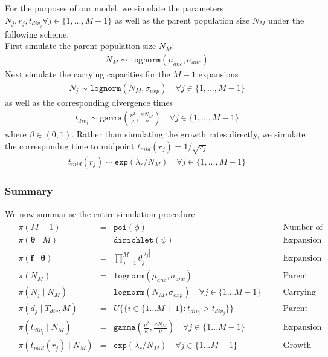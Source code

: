 \documentclass{report}
\theoremstyle{definition}
\begin{document}
For the purposes of our model, we simulate the parameters $N_j, r_j, t_{div_j} \forall j \in \{1,...,M-1\}$ as well as the parent population size $N_{M}$ under the following scheme.\\
First simulate the parent population size $N_{M}$:
\begin{gather}
N_{M} \sim \texttt{lognorm}(\mu_{anc}, \sigma_{anc})
\end{gather}
Next simulate the carrying capacities for the $M-1$ expansions
\begin{gather}
N_{j} \sim \texttt{lognorm}(N_{M}, \sigma_{exp}) \quad\forall j \in \{1,...,M-1\}
\end{gather}
as well as the corresponding divergence times
\begin{gather}
t_{div_j} \sim \texttt{gamma}\left(\frac{\nu^2}{\kappa}, \frac{\kappa N_M}{\nu}\right) \quad\forall j \in \{1,...,M-1\}
\end{gather}
where $\beta \in (0,1)$.
Rather than simulating the growth rates directly, we simulate the correspondng time to midpoint $t_{mid}(r_j) = 1/\sqrt{r_j}$
\begin{gather}
t_{mid}(r_j) \sim \texttt{exp}(\lambda_r/N_M) \quad\forall j \in \{1,...,M-1\}
\end{gather} 
\subsubsection{Summary}
We now summarise the entire simulation procedure
\begin{gather}
\begin{aligned}
&\pi(M-1) &=& \texttt{poi}(\phi) &\quad&\text{Number of expansions} \\
&\pi(\pmb\theta\mid M) &=& \texttt{dirichlet}(\psi) &\quad&\text{Expansion Membership Probabilities} \\
&\pi(\mathbf{f\mid\pmb\theta}) &=& \prod\limits_{j=1}^M\theta_j^{|f_j|}&\quad&\text{Expansion Membership Assignment} \\
&\pi(N_M) &=& \texttt{lognorm}(\mu_{anc},\sigma_{anc}) &\quad&\text{Parent Population Size}\\
&\pi(N_j\mid N_{M}) &=& \texttt{lognorm}(N_{M},\sigma_{exp})\quad\forall j \in \{1...M-1\} &\quad&\text{Carrying Capacities}\\
&\pi(d_j\mid T_{div}, M) &=& U\{\{i\in \{1 ... M+1\} : t_{div_i} > t_{div_j}\}\} &\quad&\text{Parent Populations}\\
&\pi(t_{div_j}\mid N_{M}) &=& \texttt{gamma}\left(\frac{\nu^2}{\kappa}, \frac{\kappa N_M}{\nu}\right) \quad\forall j \in \{1...M-1\} &\quad&\text{Expansion Times}\\
&\pi(t_{mid}(r_j)\mid N_M) &=& \texttt{exp}(\lambda_{r}/N_M)\quad\forall j \in \{1...M-1\} &\quad&\text{Growth Rates}
\end{aligned}
\end{gather}
\end{document}
